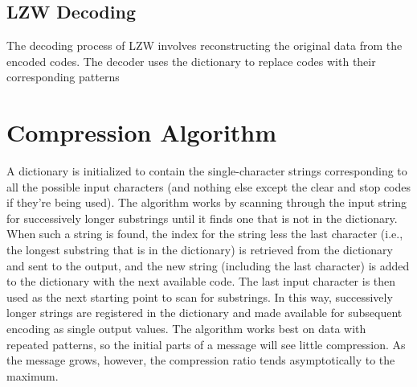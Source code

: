 \documentclass[12pt, a4paper]{article}
\begin{document}
\subsection{LZW Decoding}
The decoding process of LZW involves reconstructing the original data from the encoded codes. The decoder uses the dictionary to replace codes with their corresponding patterns
 \section{Compression Algorithm}
 A dictionary is initialized to contain the single-character strings corresponding to all the possible input characters (and nothing else except the clear and stop codes if they're being used). The algorithm works by scanning through the input string for successively longer substrings until it finds one that is not in the dictionary. When such a string is found, the index for the string less the last character (i.e., the longest substring that is in the dictionary) is retrieved from the dictionary and sent to the output, and the new string (including the last character) is added to the dictionary with the next available code. The last input character is then used as the next starting point to scan for substrings. In this way, successively longer strings are registered in the dictionary and made available for subsequent encoding as single output values. The algorithm works best on data with repeated patterns, so the initial parts of a message will see little compression. As the message grows, however, the compression ratio tends asymptotically to the maximum.
\end{document}

